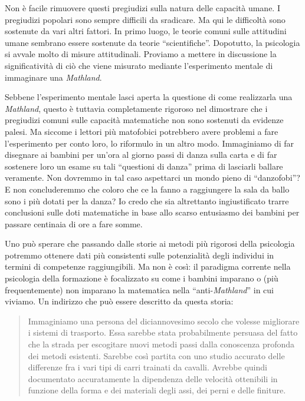 Non è facile rimuovere questi pregiudizi sulla natura delle capacità umane. I pregiudizi popolari sono sempre difficili da sradicare. Ma qui le difficoltà sono sostenute da vari altri fattori. In primo luogo, le teorie comuni sulle attitudini umane sembrano essere sostenute da teorie “scientifiche”. Dopotutto, la psicologia si avvale molto di misure attitudinali. Proviamo a mettere in discussione la significatività di ciò che viene misurato mediante l'esperimento mentale di immaginare una \textit{Mathland}.

Sebbene l'esperimento mentale lasci aperta la questione di come realizzarla una \textit{Mathland}, questo è tuttavia completamente rigoroso nel dimostrare che i pregiudizi comuni sulle capacità matematiche non sono sostenuti da evidenze palesi. Ma siccome i lettori più matofobici potrebbero avere problemi a fare l'esperimento per conto loro, lo riformulo in un altro modo. Immaginiamo di far disegnare ai bambini per un'ora al giorno passi di danza sulla carta e di far sostenere loro un esame su tali “questioni di danza” prima di lasciarli ballare veramente. Non dovremmo in tal caso aspettarci un mondo pieno di “danzofobi”? E non concluderemmo che coloro che ce la fanno a raggiungere la sala da ballo sono i più dotati per la danza? Io credo che sia altrettanto ingiustificato trarre conclusioni  sulle doti matematiche in base allo scarso entusiasmo dei bambini per passare centinaia di ore a fare somme.

Uno può sperare che passando dalle storie ai metodi più rigorosi della psicologia potremmo ottenere dati più consistenti sulle potenzialità degli individui in termini di competenze raggiungibili. Ma non è così: il paradigma corrente nella psicologia della formazione è focalizzato su come i bambini imparano o (più frequentemente) non imparano la matematica nella “anti-\textit{Mathland}” in cui viviamo. Un indirizzo che può essere descritto da questa storia:

\begin{quote}
Immaginiamo una persona del diciannovesimo secolo che volesse migliorare i sistemi di trasporto. Essa sarebbe stata probabilmente persuasa del fatto che la strada per escogitare nuovi metodi passi dalla conoscenza profonda dei metodi esistenti. Sarebbe così partita con uno studio accurato delle differenze fra i vari tipi di carri trainati da cavalli. Avrebbe quindi documentato accuratamente la dipendenza delle velocità ottenibili in funzione della forma e dei materiali degli assi, dei perni e delle finiture.
\end{quote}

